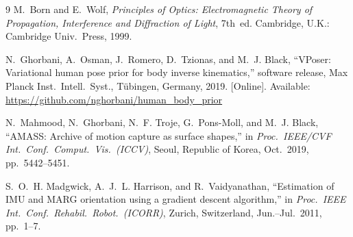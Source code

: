 \documentclass[10pt,journal,twocolumn]{IEEEtran}
\theoremstyle{plain}
\theoremstyle{definition}
\begin{document}

\begin{thebibliography}{9}
M.~Born and E.~Wolf, \emph{Principles of Optics: Electromagnetic
Theory of Propagation, Interference and Diffraction of Light},
7th~ed. Cambridge, U.K.: Cambridge Univ.\ Press, 1999.

N.~Ghorbani, A.~Osman, J.~Romero, D.~Tzionas, and M.~J. Black,
``VPoser: Variational human pose prior for body inverse
kinematics,'' software release, Max Planck Inst.\ Intell.\ Syst.,
T\"ubingen, Germany, 2019. [Online]. Available:
\url{https://github.com/nghorbani/human_body_prior}

N.~Mahmood, N.~Ghorbani, N.~F. Troje, G.~Pons-Moll, and M.~J.
Black, ``AMASS: Archive of motion capture as surface shapes,'' in
\emph{Proc.\ IEEE/CVF Int.\ Conf.\ Comput.\ Vis.\ (ICCV)}, Seoul,
Republic of Korea, Oct.~2019, pp.~5442--5451.

S.~O.~H. Madgwick, A.~J.~L. Harrison, and R.~Vaidyanathan,
``Estimation of IMU and MARG orientation using a gradient descent
algorithm,'' in \emph{Proc.\ IEEE Int.\ Conf.\ Rehabil.\ Robot.\
(ICORR)}, Zurich, Switzerland, Jun.--Jul.~2011, pp.~1--7.
\end{thebibliography}
\end{document}
